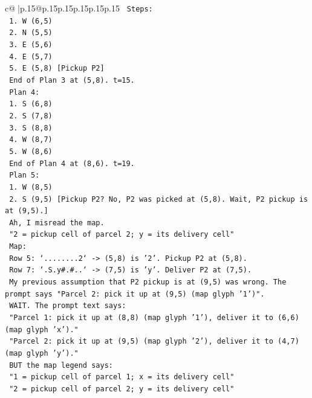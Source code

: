 \documentclass{article}
\begin{document}
{\begin{supertabular}{c@{$\;$}|p{.15\linewidth}@{}p{.15\linewidth}p{.15\linewidth}p{.15\linewidth}p{.15\linewidth}p{.15\linewidth}}
{{{\texttt{      Steps:} \\
\texttt{      1. W (6,5)} \\
\texttt{      2. N (5,5)} \\
\texttt{      3. E (5,6)} \\
\texttt{      4. E (5,7)} \\
\texttt{      5. E (5,8) {[}Pickup P2{]}} \\
\texttt{      End of Plan 3 at (5,8). t=15.} \\
\texttt{      Plan 4:} \\
\texttt{      1. S (6,8)} \\
\texttt{      2. S (7,8)} \\
\texttt{      3. S (8,8)} \\
\texttt{      4. W (8,7)} \\
\texttt{      5. W (8,6)} \\
\texttt{      End of Plan 4 at (8,6). t=19.} \\
\texttt{      Plan 5:} \\
\texttt{      1. W (8,5)} \\
\texttt{      2. S (9,5) {[}Pickup P2? No, P2 was picked at (5,8). Wait, P2 pickup is at (9,5).{]}} \\
\texttt{      Ah, I misread the map.} \\
\texttt{      "2 = pickup cell of parcel 2; y = its delivery cell"} \\
\texttt{      Map:} \\
\texttt{      Row 5: `........2` {-}> (5,8) is '2'. Pickup P2 at (5,8).} \\
\texttt{      Row 7: `.S.y\#.\#..` {-}> (7,5) is 'y'. Deliver P2 at (7,5).} \\
\texttt{      My previous assumption that P2 pickup is at (9,5) was wrong. The prompt says "Parcel 2: pick it up at (9,5) (map glyph '1')".} \\
\texttt{      WAIT. The prompt text says:} \\
\texttt{      "Parcel 1: pick it up at (8,8) (map glyph '1'), deliver it to (6,6) (map glyph 'x')."} \\
\texttt{      "Parcel 2: pick it up at (9,5) (map glyph '2'), deliver it to (4,7) (map glyph 'y')."} \\
\texttt{      BUT the map legend says:} \\
\texttt{      "1 = pickup cell of parcel 1; x = its delivery cell"} \\
\texttt{      "2 = pickup cell of parcel 2; y = its delivery cell"} \\
}}}
\end{supertabular}}
\end{document}
